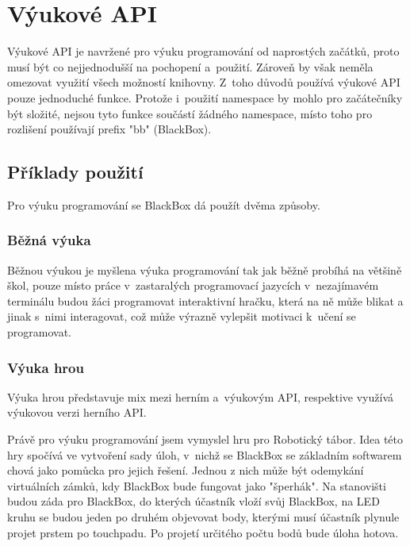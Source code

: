 \chapter{Výukové API}

Výukové API je navržené pro výuku programování od naprostých začátků, proto musí být co nejjednodušší na pochopení a~použití.
Zároveň by však neměla omezovat využití všech možností knihovny.
Z~toho důvodů používá výukové API pouze jednoduché funkce.
Protože i~použití namespace by mohlo pro začátečníky být složité, nejsou tyto funkce součástí žádného namespace, místo toho pro rozlišení používají prefix "bb" (BlackBox).



\section{Příklady použití}

Pro výuku programování se BlackBox dá použít dvěma způsoby.

\subsection{Běžná výuka}

Běžnou výukou je myšlena výuka programování tak jak běžně probíhá na většině škol, pouze místo práce v~zastaralých programovací jazycích v~nezajímavém terminálu budou žáci programovat interaktivní hračku, která na ně může blikat a jinak s~nimi interagovat, což může výrazně vylepšit motivaci k~učení se programovat.

\subsection{Výuka hrou}

Výuka hrou představuje mix mezi herním a~výukovým API, respektive využívá výukovou verzi herního API.

Právě pro výuku programování jsem vymyslel hru pro Robotický tábor.
Idea této hry spočívá ve vytvoření sady úloh, v~nichž se BlackBox se základním softwarem chová jako pomůcka pro jejich řešení.
Jednou z nich může být odemykání virtuálních zámků, kdy BlackBox bude fungovat jako "šperhák".
Na stanovišti budou záda pro BlackBox, do kterých účastník vloží svůj BlackBox, na LED kruhu se budou jeden po druhém objevovat body, kterými musí účastník plynule projet prstem po touchpadu.
Po projetí určitého počtu bodů bude úloha hotova.

